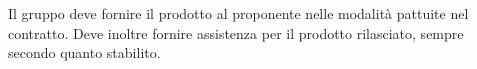 Il gruppo deve fornire il prodotto al proponente nelle modalit\`{a} pattuite nel contratto. Deve inoltre fornire assistenza per il prodotto rilasciato, sempre secondo quanto stabilito.
